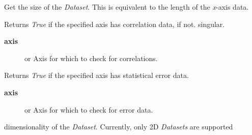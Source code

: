 \documentclass[a4paper,10pt,english]{sphinxmanual}
\begin{document}
\begin{fulllineitems}
\begin{fulllineitems}
\begin{description}
\end{description}

\end{fulllineitems}


\begin{fulllineitems}
\label{index:kafe.dataset.Dataset.get_size}
Get the size of the \emph{Dataset}. This is equivalent to the length of the \emph{x}-axis data.

\end{fulllineitems}


\begin{fulllineitems}
\label{index:kafe.dataset.Dataset.has_correlations}
Returns \emph{True} if the specified axis has correlation data,  if not.
singular.
\begin{description}
\item[{\textbf{axis}}] \leavevmode{[} or \code{'y'}{]}
Axis for which to check for correlations.

\end{description}

\end{fulllineitems}


\begin{fulllineitems}
\label{index:kafe.dataset.Dataset.has_errors}
Returns \emph{True} if the specified axis has statistical error data.
\begin{description}
\item[{\textbf{axis}}] \leavevmode{[} or \code{'y'}{]}
Axis for which to check for error data.

\end{description}

\end{fulllineitems}


\begin{fulllineitems}
\label{index:kafe.dataset.Dataset.n_axes}
dimensionality of the \emph{Dataset}. Currently, only 2D \emph{Datasets} are supported


\end{fulllineitems}
\end{fulllineitems}
\end{document}
